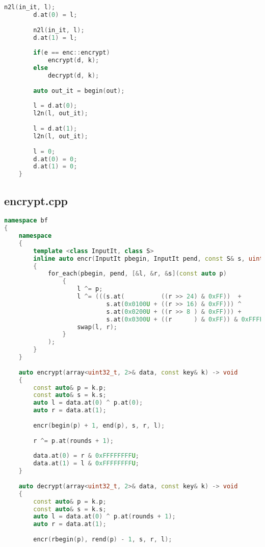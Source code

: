 \begin{appendix}
\begin{lstlisting}[language=C++]
        n2l(in_it, l);
        d.at(0) = l;
        
        n2l(in_it, l);
        d.at(1) = l;
        
        if(e == enc::encrypt)
            encrypt(d, k);
        else
            decrypt(d, k);
            
        auto out_it = begin(out);
        
        l = d.at(0);
        l2n(l, out_it);
        
        l = d.at(1);
        l2n(l, out_it);
        
        l = 0;
        d.at(0) = 0;
        d.at(1) = 0;
    }
\end{lstlisting}

\subsection{encrypt.cpp}

\begin{lstlisting}[language=C++]
namespace bf
{
    namespace
    {
        template <class InputIt, class S>
        inline auto encr(InputIt pbegin, InputIt pend, const S& s, uint32_t& l, uint32_t& r) -> void
        {
            for_each(pbegin, pend, [&l, &r, &s](const auto p)
                {
                    l ^= p;
                    l ^= (((s.at(          ((r >> 24) & 0xFF))  +
                            s.at(0x0100U + ((r >> 16) & 0xFF))) ^
                            s.at(0x0200U + ((r >> 8 ) & 0xFF))) +
                            s.at(0x0300U + ((r      ) & 0xFF)) & 0xFFFFFFFFU);
                    swap(l, r);
                }
            );
        }
    }
    
    auto encrypt(array<uint32_t, 2>& data, const key& k) -> void
    {
        const auto& p = k.p;
        const auto& s = k.s;
        auto l = data.at(0) ^ p.at(0);
        auto r = data.at(1);
        
        encr(begin(p) + 1, end(p), s, r, l);
        
        r ^= p.at(rounds + 1);
        
        data.at(0) = r & 0xFFFFFFFFU;
        data.at(1) = l & 0xFFFFFFFFU;
    }
    
    auto decrypt(array<uint32_t, 2>& data, const key& k) -> void
    {
        const auto& p = k.p;
        const auto& s = k.s;
        auto l = data.at(0) ^ p.at(rounds + 1);
        auto r = data.at(1);
        
        encr(rbegin(p), rend(p) - 1, s, r, l);
        

\end{lstlisting}
\end{appendix}
